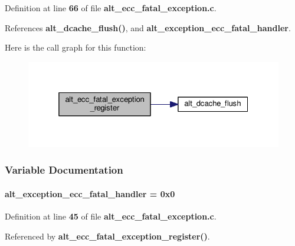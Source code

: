Definition at line {\bf 66} of file {\bf alt\+\_\+ecc\+\_\+fatal\+\_\+exception.\+c}.



References {\bf alt\+\_\+dcache\+\_\+flush()}, and {\bf alt\+\_\+exception\+\_\+ecc\+\_\+fatal\+\_\+handler}.



Here is the call graph for this function\+:
\nopagebreak
\begin{figure}[H]
\begin{center}
\leavevmode
\includegraphics[width=325pt]{d3/d8d/alt__ecc__fatal__exception_8c_a1b4ba4fbdcce537a3f91e545b8e4a9be_cgraph}
\end{center}
\end{figure}




\subsubsection{Variable Documentation}
\paragraph[{alt\+\_\+exception\+\_\+ecc\+\_\+fatal\+\_\+handler}]{ alt\+\_\+exception\+\_\+ecc\+\_\+fatal\+\_\+handler = 0x0}\label{alt__ecc__fatal__exception_8c_a450a3bf28f06a36b3a4c162e07ec009d}


Definition at line {\bf 45} of file {\bf alt\+\_\+ecc\+\_\+fatal\+\_\+exception.\+c}.



Referenced by {\bf alt\+\_\+ecc\+\_\+fatal\+\_\+exception\+\_\+register()}.

